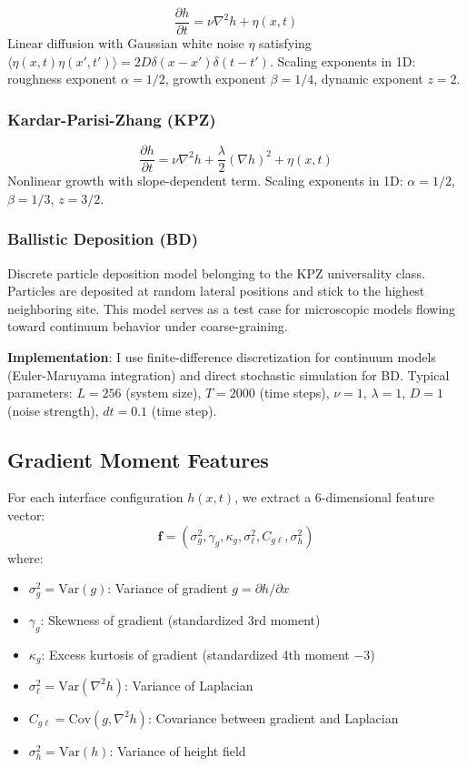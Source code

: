 \documentclass[aps,pre,twocolumn,superscriptaddress,showpacs]{revtex4-2}
\begin{document}
\begin{equation}
\frac{\partial h}{\partial t} = \nu \nabla^2 h + \eta(x,t)
\label{eq:ew}
\end{equation}
Linear diffusion with Gaussian white noise $\eta$ satisfying $\langle \eta(x,t) \eta(x',t') \rangle = 2D\delta(x-x')\delta(t-t')$. Scaling exponents in 1D: roughness exponent $\alpha = 1/2$, growth exponent $\beta = 1/4$, dynamic exponent $z = 2$.

\subsubsection{Kardar-Parisi-Zhang (KPZ)}

\begin{equation}
\frac{\partial h}{\partial t} = \nu \nabla^2 h + \frac{\lambda}{2}(\nabla h)^2 + \eta(x,t)
\label{eq:kpz}
\end{equation}
Nonlinear growth with slope-dependent term. Scaling exponents in 1D: $\alpha = 1/2$, $\beta = 1/3$, $z = 3/2$.

\subsubsection{Ballistic Deposition (BD)}

Discrete particle deposition model belonging to the KPZ universality class. Particles are deposited at random lateral positions and stick to the highest neighboring site. This model serves as a test case for microscopic models flowing toward continuum behavior under coarse-graining.

\textbf{Implementation}: I use finite-difference discretization for continuum models (Euler-Maruyama integration) and direct stochastic simulation for BD. Typical parameters: $L = 256$ (system size), $T = 2000$ (time steps), $\nu = 1$, $\lambda = 1$, $D = 1$ (noise strength), $dt = 0.1$ (time step).

\subsection{Gradient Moment Features}

For each interface configuration $h(x,t)$, we extract a 6-dimensional feature vector:
\begin{equation}
\mathbf{f} = (\sigma_g^2, \gamma_g, \kappa_g, \sigma_\ell^2, C_{g\ell}, \sigma_h^2)
\label{eq:features}
\end{equation}
where:
\begin{itemize}
\item $\sigma_g^2 = \text{Var}(g)$: Variance of gradient $g = \partial h/\partial x$
\item $\gamma_g$: Skewness of gradient (standardized 3rd moment)
\item $\kappa_g$: Excess kurtosis of gradient (standardized 4th moment $-3$)
\item $\sigma_\ell^2 = \text{Var}(\nabla^2 h)$: Variance of Laplacian
\item $C_{g\ell} = \text{Cov}(g, \nabla^2 h)$: Covariance between gradient and Laplacian
\item $\sigma_h^2 = \text{Var}(h)$: Variance of height field
\end{itemize}
\end{document}
